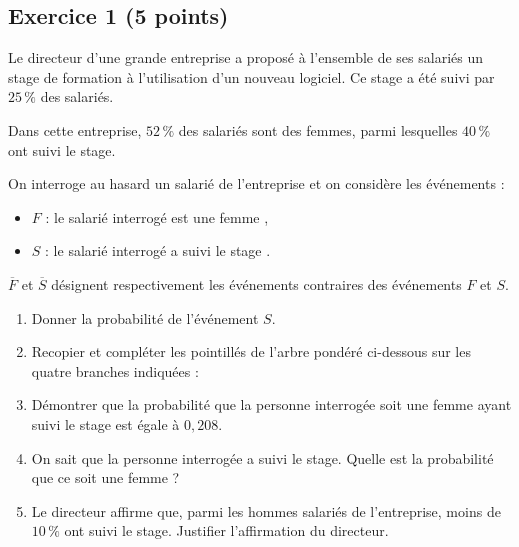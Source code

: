 \documentclass[11pt,a4paper]{article}
\begin{document}
\vspace{0.2cm}

\subsection*{Exercice 1 \hfill (5 points)}

Le directeur d'une grande entreprise a proposé à l'ensemble de ses salariés un stage de formation à l'utilisation d'un nouveau logiciel. Ce stage a été suivi par $25\,\%$ des salariés.

Dans cette entreprise, $52\,\%$ des salariés sont des femmes, parmi lesquelles $40\,\%$ ont suivi le stage.

On interroge au hasard un salarié de l'entreprise et on considère les événements :
\begin{itemize}[label=$\bullet$]
    \item $F$ : \og le salarié interrogé est une femme \fg{},
    \item $S$ : \og le salarié interrogé a suivi le stage \fg{}.
\end{itemize}
$\overline{F}$ et $\overline{S}$ désignent respectivement les événements contraires des événements $F$ et $S$.

\begin{enumerate}
    \item Donner la probabilité de l'événement $S$.
    \item Recopier et compléter les pointillés de l'arbre pondéré ci-dessous sur les quatre branches indiquées :
    \begin{center}
    \end{center}
    \item Démontrer que la probabilité que la personne interrogée soit une femme ayant suivi le stage est égale à $0{,}208$.
    \item On sait que la personne interrogée a suivi le stage. Quelle est la probabilité que ce soit une femme ?
    \item Le directeur affirme que, parmi les hommes salariés de l'entreprise, moins de $10\,\%$ ont suivi le stage. Justifier l'affirmation du directeur.
\end{enumerate}
\end{document}
